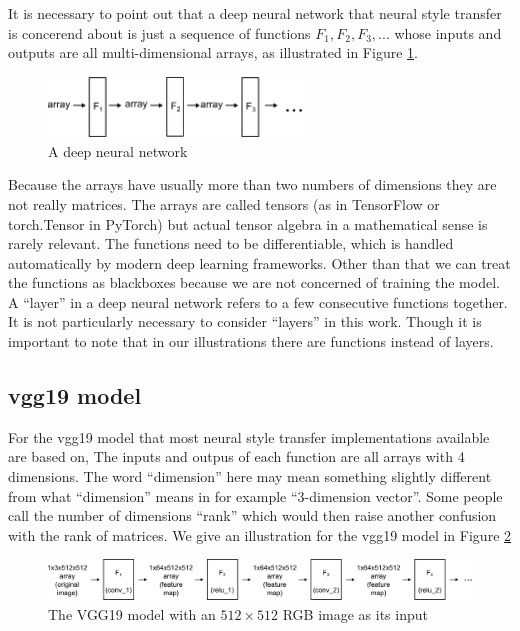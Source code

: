 \documentclass[runningheads]{llncs}
\begin{document}
It is necessary to point out that a deep neural network that neural style transfer
is concerend about
is just a sequence of functions
$F_1,F_2,F_3,...$
whose inputs and outputs are all multi-dimensional arrays, as illustrated in Figure \ref{f1f2f3}.
\begin{figure}
\center
\includegraphics[width=0.6\textwidth]{f1f2f3.pdf}
\caption{A deep neural network \label{f1f2f3}}
\end{figure}
Because the arrays have usually more than two numbers of dimensions
they are not really matrices.
The arrays are called tensors (as in TensorFlow or torch.Tensor in PyTorch) 
but actual tensor algebra in a mathematical sense is rarely relevant.
The functions need to be differentiable, which is handled automatically by modern 
deep learning frameworks.
Other than that we can treat the functions as blackboxes because we are 
not concerned of training the model.
A ``layer'' in a deep neural network refers to a few consecutive functions together.
It is not particularly necessary to consider ``layers'' in this work. 
Though it is important to note that in our illustrations there are functions instead of layers.

\subsection{vgg19 model}
For the vgg19 model that most neural style transfer implementations available are based on,
The inputs and outpus of each function are all arrays with 4 dimensions.
The word ``dimension'' here may mean something slightly different from what ``dimension'' means in
for example ``$3$-dimension vector''. 
Some people call the number of dimensions ``rank'' which would then raise another confusion with the rank of matrices.
We give an illustration for the vgg19 model in Figure \ref{vgg512}
\begin{figure}
\center
\includegraphics[width=\textwidth]{vgg512.pdf}
\caption{The VGG19 model with an $512\times512$ RGB image as its input \label{vgg512}}
\end{figure}
\end{document}
